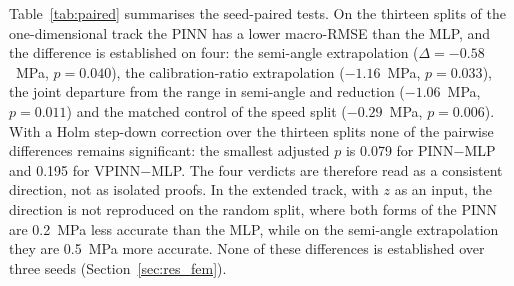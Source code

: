 \documentclass[subscriptcorrection,upint,varvw,barcolor=Goldenrod3,mathalfa=cal=euler,balance,hyphenate,french,pdf-a]{asmejour} %
\begin{document}

Table~\ref{tab:paired} summarises the seed-paired tests. On the thirteen splits of the one-dimensional track the PINN has a lower macro-RMSE than the MLP, and the difference is established on four: the semi-angle extrapolation ($\Delta=-0.58$~MPa, $p=0.040$), the calibration-ratio extrapolation ($-1.16$~MPa, $p=0.033$), the joint departure from the range in semi-angle and reduction ($-1.06$~MPa, $p=0.011$) and the matched control of the speed split ($-0.29$~MPa, $p=0.006$). With a Holm step-down correction \citep{holm1979,demsar2006} over the thirteen splits none of the pairwise differences remains significant: the smallest adjusted $p$ is 0.079 for PINN$-$MLP and 0.195 for VPINN$-$MLP. The four verdicts are therefore read as a consistent direction, not as isolated proofs. In the extended track, with $z$ as an input, the direction is not reproduced on the random split, where both forms of the PINN are 0.2~MPa less accurate than the MLP, while on the semi-angle extrapolation they are 0.5~MPa more accurate. None of these differences is established over three seeds (Section~\ref{sec:res_fem}). %
\end{document}
